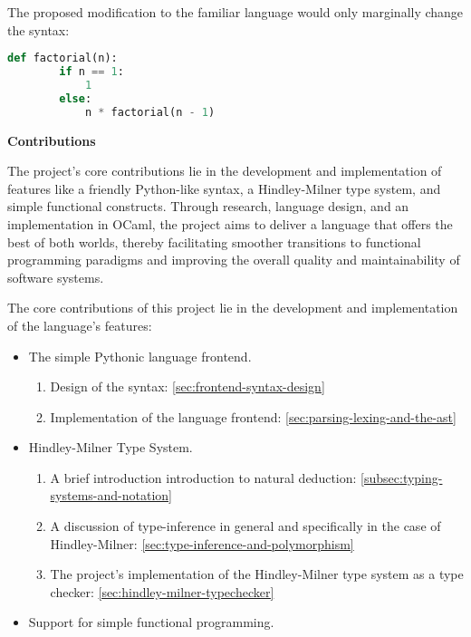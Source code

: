 \documentclass{l4proj}
\begin{document}
The proposed modification to the familiar language would only marginally change the syntax:

\begin{lstlisting}[language=Python, caption=A proposed PyFunc program to find the factorial of a given number (n).]
    def factorial(n):
        if n == 1:
            1
        else:
            n * factorial(n - 1)
\end{lstlisting}



\textbf{Contributions}

The project's core contributions lie in the development and implementation of features like a friendly Python-like syntax, a Hindley-Milner type system, and simple functional constructs.
Through research, language design, and an implementation in OCaml, the project aims to deliver a language that offers the best of both worlds, thereby facilitating smoother transitions to functional programming paradigms and improving the overall quality and maintainability of software systems.

The core contributions of this project lie in the development and implementation of the language’s features:

\begin{itemize}
    \item The simple Pythonic language frontend.
    \begin{enumerate}
        \item Design of the syntax: \ref{sec:frontend-syntax-design}
        \item Implementation of the language frontend: \ref{sec:parsing-lexing-and-the-ast}
    \end{enumerate}
    \item Hindley-Milner Type System.
    \begin{enumerate}
        \item A brief introduction introduction to natural deduction: \ref{subsec:typing-systems-and-notation}
        \item A discussion of type-inference in general and specifically in the case of Hindley-Milner: \ref{sec:type-inference-and-polymorphism}
        \item The project's implementation of the Hindley-Milner type system as a type checker: \ref{sec:hindley-milner-typechecker}
    \end{enumerate}
    \item Support for simple functional programming.
\end{itemize}
\end{document}
